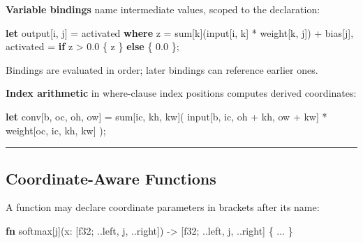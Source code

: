 \documentclass[11pt,]{article}
\newenvironment{Shaded}{}{}
\newcommand{\DataTypeTok}[1]{\textcolor[rgb]{0.56,0.13,0.00}{#1}}
\newcommand{\DecValTok}[1]{\textcolor[rgb]{0.25,0.63,0.44}{#1}}
\newcommand{\KeywordTok}[1]{\textcolor[rgb]{0.00,0.44,0.13}{\textbf{#1}}}
\newcommand{\NormalTok}[1]{#1}
\newcommand{\OperatorTok}[1]{\textcolor[rgb]{0.40,0.40,0.40}{#1}}
\begin{document}
\textbf{Variable bindings} name intermediate values, scoped to the
declaration:

\begin{Shaded}
\begin{Highlighting}[]
\KeywordTok{let}\NormalTok{ output}\OperatorTok{[}\NormalTok{i, j}\OperatorTok{]}\NormalTok{ = activated}
    \KeywordTok{where}\NormalTok{ z = sum}\OperatorTok{[}\NormalTok{k}\OperatorTok{]}\NormalTok{(input}\OperatorTok{[}\NormalTok{i, k}\OperatorTok{]}\NormalTok{ * weight}\OperatorTok{[}\NormalTok{k, j}\OperatorTok{]}\NormalTok{) + bias}\OperatorTok{[}\NormalTok{j}\OperatorTok{]}\NormalTok{,}
\NormalTok{          activated = }\KeywordTok{if}\NormalTok{ z > }\DecValTok{0.0} \OperatorTok{\{}\NormalTok{ z }\OperatorTok{\}} \KeywordTok{else} \OperatorTok{\{} \DecValTok{0.0} \OperatorTok{\}}\NormalTok{;}
\end{Highlighting}
\end{Shaded}

Bindings are evaluated in order; later bindings can reference earlier
ones.

\textbf{Index arithmetic} in where-clause index positions computes
derived coordinates:

\begin{Shaded}
\begin{Highlighting}[]
\KeywordTok{let}\NormalTok{ conv}\OperatorTok{[}\NormalTok{b, oc, oh, ow}\OperatorTok{]}\NormalTok{ = sum}\OperatorTok{[}\NormalTok{ic, kh, kw}\OperatorTok{]}\NormalTok{(}
\NormalTok{    input}\OperatorTok{[}\NormalTok{b, ic, oh + kh, ow + kw}\OperatorTok{]}\NormalTok{ * weight}\OperatorTok{[}\NormalTok{oc, ic, kh, kw}\OperatorTok{]}
\NormalTok{);}
\end{Highlighting}
\end{Shaded}

\begin{center}\rule{0.5\linewidth}{0.4pt}\end{center}

\hypertarget{coordinate-aware-functions}{%
\subsection{Coordinate-Aware
Functions}\label{coordinate-aware-functions}}

A function may declare coordinate parameters in brackets after its name:

\begin{Shaded}
\begin{Highlighting}[]
\KeywordTok{fn}\NormalTok{ softmax[j](x: }\OperatorTok{[}\DataTypeTok{f32}\NormalTok{; ..left, j, ..right}\OperatorTok{]}\NormalTok{)}
\NormalTok{    -> }\OperatorTok{[}\DataTypeTok{f32}\NormalTok{; ..left, j, ..right}\OperatorTok{]}
\OperatorTok{\{}\NormalTok{ ... }\OperatorTok{\}}
\end{Highlighting}
\end{Shaded}
\end{document}
